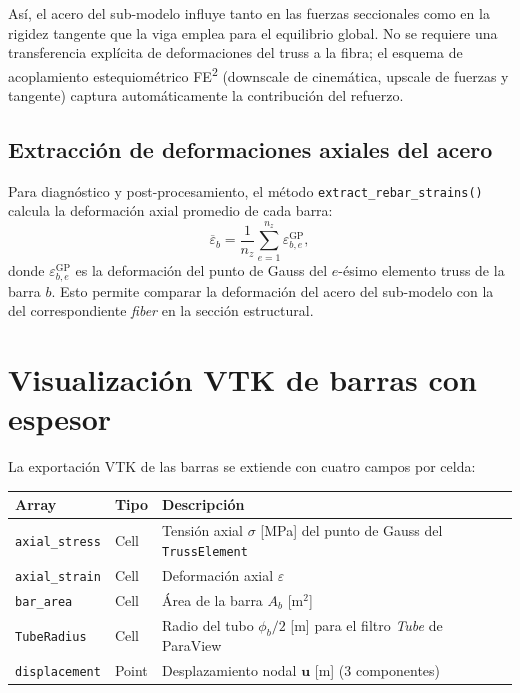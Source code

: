 Así, el acero del sub-modelo influye tanto en las fuerzas
seccionales como en la rigidez tangente que la viga emplea para el
equilibrio global.  No se requiere una transferencia explícita de
deformaciones del truss a la fibra; el esquema de acoplamiento
estequiométrico FE\textsuperscript{2} (downscale de cinemática,
upscale de fuerzas y tangente) captura automáticamente la
contribución del refuerzo.

\subsection{Extracción de deformaciones axiales del acero}

Para diagnóstico y post-procesamiento, el método
\texttt{extract\_rebar\_strains()} calcula la deformación axial
promedio de cada barra:
%
\begin{equation}
  \overline{\varepsilon}_b =
    \frac{1}{n_z} \sum_{e=1}^{n_z} \varepsilon_{b,e}^{\text{GP}},
\end{equation}
%
donde $\varepsilon_{b,e}^{\text{GP}}$ es la deformación del punto
de Gauss del $e$-ésimo elemento truss de la barra $b$.  Esto permite
comparar la deformación del acero del sub-modelo con la del
correspondiente \emph{fiber} en la sección estructural.


\section{Visualización VTK de barras con espesor}
\label{sec:emb-vtk}

La exportación VTK de las barras se extiende con cuatro campos por
celda:

\begin{center}
\begin{tabular}{llp{7cm}}
\toprule
Array & Tipo & Descripción \\
\midrule
\texttt{axial\_stress} & Cell & Tensión axial $\sigma$ [MPa] del
  punto de Gauss del \texttt{TrussElement} \\
\texttt{axial\_strain} & Cell & Deformación axial
  $\varepsilon$ \\
\texttt{bar\_area}      & Cell & Área de la barra $A_b$
  [m$^2$] \\
\texttt{TubeRadius}     & Cell & Radio del tubo
  $\phi_b / 2$ [m] para el filtro \emph{Tube} de ParaView \\
\texttt{displacement}   & Point & Desplazamiento nodal
  $\mathbf{u}$ [m] (3 componentes) \\
\bottomrule
\end{tabular}
\end{center}

